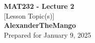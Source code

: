 \begin{titlepage}
    \null %
    \vfill
    \begin{center}
        {\fontsize{40}{48}\selectfont \bfseries MAT232 - Lecture 2}
        \vspace{20pt} \\
        {\LARGE [Lesson Topic(s)]} \\
        \vspace{20pt}
        \textbf{AlexanderTheMango}
        \vspace{8pt}
        \\ Prepared for January 9, 2025
    \end{center}
    \vfill
\end{titlepage}
